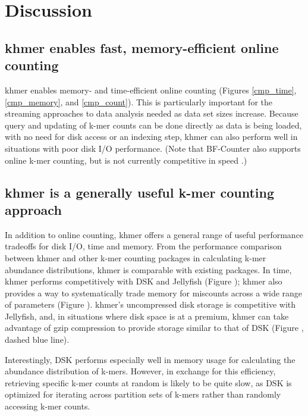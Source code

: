 \documentclass{article}
\begin{document}

\section{Discussion}

\subsection{khmer enables fast, memory-efficient online counting}

khmer enables memory- and time-efficient online counting (Figures \ref{cmp_time}, \ref{cmp_memory}, and \ref{cmp_count}).  This is
particularly important for the streaming approaches to data analysis
needed as data set sizes increase.  Because query and updating of
k-mer counts can be done directly as data is being loaded, with no
need for disk access or an indexing step, khmer can also perform
well in situations with poor disk I/O performance.  (Note that BF-Counter
also supports online k-mer counting, but is not currently competitive
in speed \cite{Deorowicz2013}.)

\subsection{khmer is a generally useful k-mer counting approach}

In addition to online counting, khmer offers a general range of useful
performance tradeoffs for disk I/O, time and memory.  From the
performance comparison between khmer and other k-mer counting packages
in calculating k-mer abundance distributions, khmer is comparable with
existing packages.  In time, khmer performs competitively with DSK and
Jellyfish (Figure \cite{cmp_time}); khmer also provides a way to systematically trade memory
for miscounts across a wide range of parameters (Figure \cite{cmp_memory}).  khmer's
uncompressed disk storage is competitive with Jellyfish, and, in
situations where disk space is at a premium, khmer can take advantage
of gzip compression to provide storage similar to that of DSK (Figure \cite{cmp_disk}, dashed blue line).

Interestingly, DSK performs especially well in memory usage
for calculating the abundance distribution of k-mers. However, in
exchange for this efficiency, retrieving specific k-mer counts at
random is likely to be quite slow, as DSK is optimized for iterating
across partition sets of k-mers rather than randomly accessing k-mer
counts.
\end{document}
